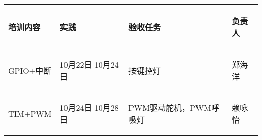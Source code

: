 
\begin{longtable}{ p{1.5cm} | p{3cm} | p{6cm} | p{4.3cm} |}

    \hline

    \endfoot
    
    \rowcolor{tabhdcolor}

        \begin{center}
            培训内容
        \end{center} &
        \begin{center}
            实践
        \end{center} &
        \begin{center}
            验收任务
        \end{center} &
        \begin{center}
            负责人
        \end{center}\\

    \hline

    \endhead

        \begin{center}
            GPIO+中断
        \end{center} &
        \begin{center}
            10月22日-10月24日
        \end{center} &
        \begin{center}
            按键控灯
        \end{center} &
        \begin{center}
            郑海洋
        \end{center}\\
        
    \hline
        \begin{center}
            TIM+PWM
        \end{center}&
        \begin{center}
            10月24日-10月28日
        \end{center}&
        \begin{center}
            PWM驱动舵机，PWM呼吸灯
        \end{center}&
        \begin{center}
            赖咏怡
        \end{center}\\
        

\end{longtable}
